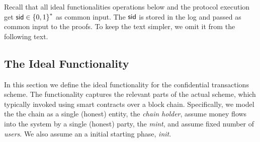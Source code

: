 \begin{remark}[$\sid$]\label{rem:sid}
Recall that all ideal functionalities operations below and the protocol execution get $\sid\in \zs$ as common input. The $\sid$ is stored in the log and passed as common input to the proofs. To keep the text simpler, we omit it from the following text.
\end{remark}


\subsection{The Ideal Functionality}\label{sec:MainProtocol:Ideal}
In this section we define the ideal functionality for the confidential transactions scheme. The functionality  captures the relevant parts of the actual scheme, which typically invoked using smart contracts over a block chain. Specifically, we model the  the chain as a single (honest) entity, the \textit{chain holder}, assume money flows into the system by a single (honest) party, the \textit{mint}, and assume fixed number of \textit{users}. We also assume an a initial starting phase,  \textit{init}.  

